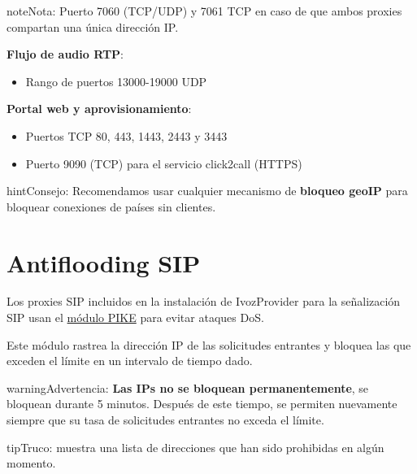 \documentclass[letterpaper,10pt,spanish]{sphinxmanual}
\begin{document}
\begin{notice}{note}{Nota:}
Puerto 7060 (TCP/UDP) y 7061 TCP en caso de que ambos proxies compartan una única dirección IP.
\end{notice}

\textbf{Flujo de audio RTP}:
\begin{itemize}
\item {} 
Rango de puertos 13000-19000 UDP

\end{itemize}

\textbf{Portal web y aprovisionamiento}:
\begin{itemize}
\item {} 
Puertos TCP 80, 443, 1443, 2443 y 3443

\item {} 
Puerto 9090 (TCP) para el servicio click2call (HTTPS)

\end{itemize}

\begin{notice}{hint}{Consejo:}
Recomendamos usar cualquier mecanismo de \textbf{bloqueo geoIP} para bloquear conexiones de países sin clientes.
\end{notice}


\section{Antiflooding SIP}
\label{security_and_maintenance/security/antiflooding::doc}\label{security_and_maintenance/security/antiflooding:sip-antiflooding}\label{security_and_maintenance/security/antiflooding:id1}
Los proxies SIP incluidos en la instalación de IvozProvider para la señalización SIP usan el \href{http://kamailio.org/docs/modules/5.1.x/modules/pike.html}{módulo PIKE} para evitar ataques DoS.

Este módulo rastrea la dirección IP de las solicitudes entrantes y bloquea las que exceden el límite en un intervalo de tiempo dado.

\begin{notice}{warning}{Advertencia:}
\textbf{Las IPs no se bloquean permanentemente}, se bloquean durante 5 minutos. Después de este tiempo, se permiten nuevamente siempre que su tasa de solicitudes entrantes no exceda el límite.
\end{notice}

\begin{notice}{tip}{Truco:}
{\hyperref[administration_portal/platform/antiflood_banned_ips:antiflood\string-banned\string-ips]{}} muestra una lista de direcciones que han sido prohibidas en algún momento.
\end{notice}
\end{document}
